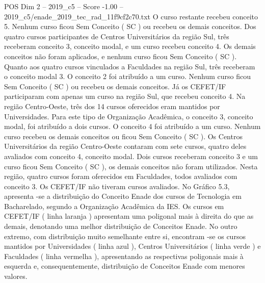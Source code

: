 \begin{textsample}{POS Dim 2 – 2019\_c5 – Score -1.00 – 2019\_c5/enade\_2019\_tec\_rad\_11f9cf2c70.txt}
O curso restante recebeu conceito 5.
Nenhum curso ficou Sem Conceito ( SC ) ou recebeu os demais conceitos.
Dos quatro cursos participantes de Centros Universitários da região Sul, três receberam conceito 3, conceito modal, e um curso recebeu conceito 4.
Os demais conceitos não foram aplicados, e nenhum curso ficou Sem Conceito ( SC ).
Quanto aos quatro cursos vinculados a Faculdades na região Sul, três receberam o conceito modal 3.
O conceito 2 foi atribuído a um curso.
Nenhum curso ficou Sem Conceito ( SC ) ou recebeu os demais conceitos.
Já os CEFET/IF participaram com apenas um curso na região Sul, que recebeu conceito 4.
Na região Centro-Oeste, três dos 14 cursos oferecidos eram mantidos por Universidades.
Para este tipo de Organização Acadêmica, o conceito 3, conceito modal, foi atribuído a dois cursos.
O conceito 4 foi atribuído a um curso.
Nenhum curso recebeu os demais conceitos ou ficou Sem Conceito ( SC ).
Os Centros Universitários da região Centro-Oeste contaram com sete cursos, quatro deles avaliados com conceito 4, conceito modal.
Dois cursos receberam conceito 3 e um curso ficou Sem Conceito ( SC ), os demais conceitos não foram utilizados.
Nesta região, quatro cursos foram oferecidos em Faculdades, todos avaliados com conceito 3.
Os CEFET/IF não tiveram cursos avaliados.
No Gráfico 5.3, apresenta -se a distribuição do Conceito Enade dos cursos de Tecnologia em Bacharelado, segundo a Organização Acadêmica da IES.
Os cursos em CEFET/IF ( linha laranja ) apresentam uma poligonal mais à direita do que as demais, denotando uma melhor distribuição de Conceitos Enade.
No outro extremo, com distribuição muito semelhante entre si, encontram -se os cursos mantidos por Universidades ( linha azul ), Centros Universitários ( linha verde ) e Faculdades ( linha vermelha ), apresentando as respectivas poligonais mais à esquerda e, consequentemente, distribuição de Conceitos Enade com menores valores.

\end{textsample}
